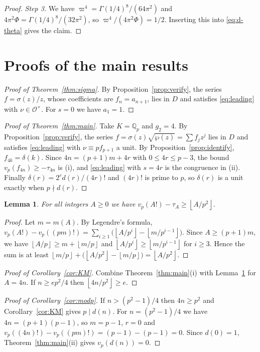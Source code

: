 \documentclass[11pt]{amsart}
\newtheorem{lemma}[theorem]{Lemma}
\theoremstyle{definition}
\theoremstyle{remark}
\newcommand{\Q}{\mathbb{Q}}
\newcommand{\cO}{\mathcal{O}}
\newcommand{\fl}[1]{\left\lfloor #1 \right\rfloor}
\begin{document}
\begin{proof}
\emph{Step 3.} We have $\varpi^4=\Gamma(1/4)^8/(64\pi^2)$ and
$4\pi^2\Phi=\Gamma(1/4)^8/(32\pi^2)$, so $\varpi^4/(4\pi^2\Phi)=1/2$. Inserting this into
\eqref{eq:d-theta} gives the claim.
\end{proof}

\section{Proofs of the main results}\label{sec:proofs}

\begin{proof}[Proof of Theorem~\ref{thm:sigma}]
By Proposition~\ref{prop:verify}, the series $f=\sigma(z)/z$, whose coefficients are
$f_n=a_{n+1}$, lies in $D$ and satisfies \eqref{eq:leading} with $\nu\in\cO^\times$. For $s=0$ we
have $a_1=1$.
\end{proof}

\begin{proof}[Proof of Theorem~\ref{thm:main}]
Take $K=\Q_p$ and $g_2=4$. By Proposition~\ref{prop:verify}, the series
$f=\sigma(z)\sqrt{\wp(z)}=\sum f_jz^j$ lies in $D$ and satisfies \eqref{eq:leading} with
$\nu\equiv pf_{p+1}$ a unit. By
Proposition~\ref{prop:identify}, $f_{4k}=\delta(k)$. Since $4n=(p+1)m+4r$ with $0\le4r\le p-3$, the
bound $v_p(f_{4n})\ge-\tau_{4n}$ is (i), and \eqref{eq:leading} with $s=4r$ is the congruence in
(ii). Finally $\delta(r)=2^rd(r)/(4r)!$ and $(4r)!$ is prime to $p$, so $\delta(r)$ is a unit exactly when
$p\nmid d(r)$.
\end{proof}

\begin{lemma}\label{lem:floor}
For all integers $A\ge0$ we have $v_p(A!)-\tau_A\ge\fl{A/p^2}$.
\end{lemma}

\begin{proof}
Let $m=m(A)$. By Legendre's formula,
$v_p(A!)-v_p((pm)!)=\sum_{i\ge1}\bigl(\fl{A/p^i}-\fl{m/p^{i-1}}\bigr)$. Since $A\ge(p+1)m$, we have
$\fl{A/p}\ge m+\fl{m/p}$ and $\fl{A/p^i}\ge\fl{m/p^{i-1}}$ for $i\ge3$. Hence the sum is at least
$\fl{m/p}+\bigl(\fl{A/p^2}-\fl{m/p}\bigr)=\fl{A/p^2}$.
\end{proof}

\begin{proof}[Proof of Corollary~\ref{cor:KM}]
Combine Theorem~\ref{thm:main}(i) with Lemma~\ref{lem:floor} for $A=4n$. If $n\ge ep^2/4$ then
$\fl{4n/p^2}\ge e$.
\end{proof}

\begin{proof}[Proof of Corollary~\ref{cor:modp}]
If $n>(p^2-1)/4$ then $4n\ge p^2$ and Corollary~\ref{cor:KM} gives $p\mid d(n)$. For
$n=(p^2-1)/4$ we have $4n=(p+1)(p-1)$, so $m=p-1$, $r=0$ and
$v_p((4n)!)-v_p((pm)!)=(p-1)-(p-1)=0$. Since $d(0)=1$, Theorem~\ref{thm:main}(ii) gives
$v_p(d(n))=0$.
\end{proof}
\end{document}
